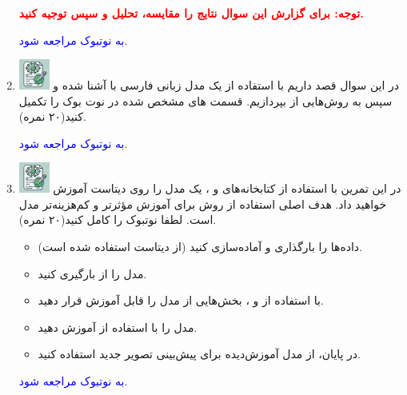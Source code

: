\documentclass[12pt]{article}
\begin{document}
\begin{enumerate}
    \textcolor{red}{\textbf{توجه: برای گزارش این سوال نتایج را مقایسه، تحلیل و سپس توجیه کنید.}}
    
    \textcolor{blue}{به نوتبوک  مراجعه شود.}
    \item \includegraphics[width=1cm]{figs/Allowed_with_contributino.jpg}
     در این سوال قصد داریم با استفاده از یک مدل زبانی فارسی با   آشنا شده و سپس به روش‌هایی از  بپردازیم. قسمت های مشخص شده در نوت بوک  را تکمیل کنید(۲۰ نمره).

    \textcolor{blue}{به نوتبوک  مراجعه شود.}
     \item \includegraphics[width=1cm]{figs/Allowed_with_contributino.jpg}
     در این تمرین با استفاده از کتابخانه‌های   و ، یک مدل  را روی دیتاست  آموزش خواهید داد. هدف اصلی استفاده از روش  برای آموزش مؤثرتر و کم‌هزینه‌تر مدل است. لطفا نوتبوک  را کامل کنید(۲۰ نمره).

     \begin{itemize}
         \item داده‌ها را بارگذاری و آماده‌سازی کنید (از دیتاست  استفاده شده است).
         \item     مدل  را از  بارگیری کنید.
        \item     با استفاده از  و ، بخش‌هایی از مدل را قابل آموزش قرار دهید.
        \item     مدل را با استفاده از  آموزش دهید.
        \item     در پایان، از مدل آموزش‌دیده برای پیش‌بینی تصویر جدید استفاده کنید.
    
     \end{itemize}
    \textcolor{blue}{به نوتبوک  مراجعه شود.}


\end{enumerate}
\end{document}
